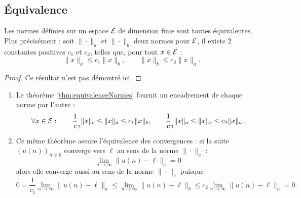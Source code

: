 \subsection{\'Equivalence} 

\begin{theorem} \label{thm:equivalenceNormes}
  Les normes définies sur un espace $\mathcal{E}$ de dimension finie sont toutes équivalentes. Plus précisément : soit $\|\cdot\|_a$ et $\|\cdot\|_b$ deux normes pour $\mathcal{E}$, il existe 2 constantes positives $c_1$ et $c_2$, telles que, pour tout $x \in \mathcal{E}$ :
  $$
  \|x\|_a \leq c_1 \|x\|_b, \qquad
  \|x\|_b \leq c_2 \|x\|_a.
  $$
\end{theorem}

\begin{proof}
Ce résultat n'est pas démontré ici. 
\end{proof}


\remarks
\begin{enumerate}
  \item Le théorème \ref{thm:equivalenceNormes} fournit un encadrement de chaque norme par l'autre : 
  $$
  \forall x \in \mathcal{E}: \qquad
  \frac1c_2 \|x\|_b \leq \|x\|_a \leq c_1 \|x\|_b, \qquad
  \frac1c_1 \|x\|_a \leq \|x\|_b \leq c_2 \|x\|_a.
  $$
  \item Ce même théorème assure l'équivalence des convergences : si la suite $(u(n))_{n \geq 0}$ converge vers $\ell$ au sens de la norme $\|\cdot\|_a$ :
  $$
  \lim_{n \to \infty} \|u(n) - \ell\|_a = 0
  $$
  alors elle converge aussi au sens de la norme $\|\cdot\|_b$ puisque
  $$
  0 = \frac1{c_1} \lim_{n \to \infty} \|u(n) - \ell\|_a
  \leq \lim_{n \to \infty} \|u(n) - \ell\|_b \leq
  c_2 \lim_{n \to \infty} \|u(n) - \ell\|_a = 0.
  $$
\end{enumerate}

